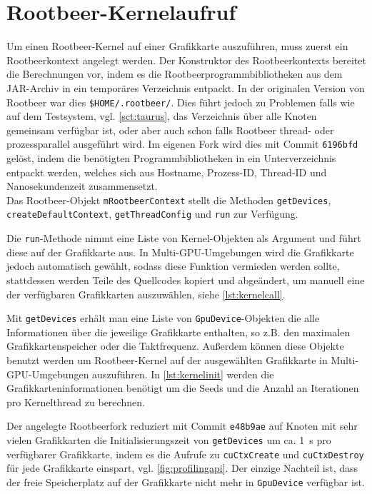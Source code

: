 \section{Rootbeer-Kernelaufruf}

Um einen Rootbeer-Kernel auf einer Grafikkarte auszuführen, muss zuerst ein Rootbeerkontext angelegt werden.
Der Konstruktor des Rootbeerkontexts bereitet die Berechnungen vor, indem es die Rootbeerprogrammbibliotheken aus dem JAR-Archiv in ein temporäres Verzeichnis entpackt.
In der originalen Version von Rootbeer war dies \lstinline!$HOME/.rootbeer/!.
Dies führt jedoch zu Problemen falls wie auf dem Testsystem, vgl. \autoref{sct:taurus}, das Verzeichnis über alle Knoten gemeinsam verfügbar ist, oder aber auch schon falls Rootbeer thread- oder prozessparallel ausgeführt wird.
Im eigenen Fork \cite{ownrootbeerfork} wird dies mit Commit \lstinline!6196bfd! gelöst, indem die benötigten Programmbibliotheken in ein Unterverzeichnis entpackt werden, welches sich aus Hostname, Prozess-ID, Thread-ID und Nanosekundenzeit zusammensetzt.\\

Das Rootbeer-Objekt \lstinline!mRootbeerContext! stellt die Methoden \lstinline!getDevices!, \lstinline!createDefaultContext!, \lstinline!getThreadConfig! und \lstinline!run! zur Verfügung.

Die \lstinline!run!-Methode nimmt eine Liste von Kernel-Objekten als Argument und führt diese auf der Grafikkarte aus. In Multi-GPU-Umgebungen wird die Grafikkarte jedoch automatisch gewählt, sodass diese Funktion vermieden werden sollte, stattdessen werden Teile des Quellcodes kopiert und abgeändert, um manuell eine der verfügbaren Grafikkarten auszuwählen, siehe \autoref{lst:kernelcall}.

Mit \lstinline!getDevices! erhält man eine Liste von \lstinline!GpuDevice!-Objekten die alle Informationen über die jeweilige Grafikkarte enthalten, so z.B. den maximalen Grafikkartenspeicher oder die Taktfrequenz.
Außerdem können diese Objekte benutzt werden um Rootbeer-Kernel auf der ausgewählten Grafikkarte in Multi-GPU-Umgebungen auszuführen. In \autoref{lst:kernelinit} werden die Grafikkarteninformationen benötigt um die Seeds und die Anzahl an Iterationen pro Kernelthread zu berechnen.

\label{pg:cuCtxCreate}
Der angelegte Rootbeerfork \cite{ownrootbeerfork} reduziert mit Commit \lstinline!e48b9ae! auf Knoten mit sehr vielen Grafikkarten die Initialisierungszeit von \lstinline!getDevices! um ca. \SI{1}{\second} pro verfügbarer Grafikkarte, indem es die Aufrufe zu \lstinline!cuCtxCreate! und \lstinline!cuCtxDestroy! für jede Grafikkarte einspart, vgl. \autoref{fig:profilingapi}.
Der einzige Nachteil ist, dass der freie Speicherplatz auf der Grafikkarte nicht mehr in \lstinline!GpuDevice! verfügbar ist.

